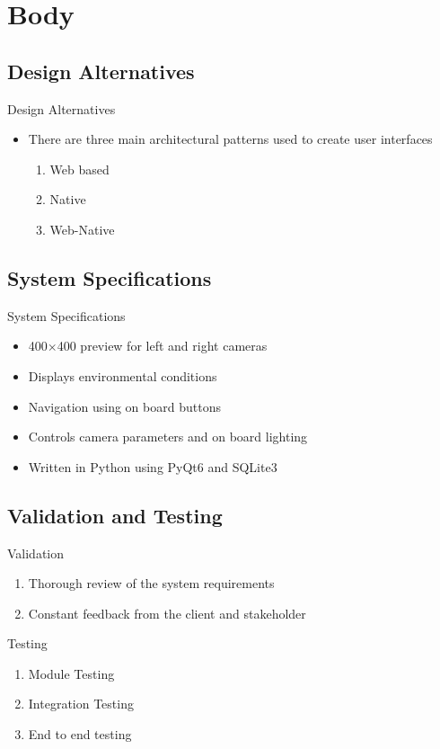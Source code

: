 \documentclass[17pt, aspectratio=169]{beamer}
\begin{document}
\section{Body}
\subsection*{Design Alternatives}
\begin{frame}{Design Alternatives}
	\begin{itemize}

		\item There are three main architectural patterns used to create user interfaces
		      \begin{enumerate}
			      \item Web based
			      \item Native
			      \item Web-Native
		      \end{enumerate}
	\end{itemize}
\end{frame}
\subsection*{System Specifications}
\begin{frame}{System Specifications}
	\begin{itemize}
		\item 400$\times$400 preview for left and right cameras
		\item Displays environmental conditions
		\item Navigation using on board buttons
		\item Controls camera parameters and on board lighting
		\item Written in Python using PyQt6 and SQLite3
	\end{itemize}
\end{frame}
\subsection*{Validation and Testing}
\begin{frame}{Validation}
	\begin{enumerate}
		\item Thorough review of the system requirements
		\item Constant feedback from the client and stakeholder
	\end{enumerate}
\end{frame}
\begin{frame}{Testing}
	\begin{enumerate}
		\item Module Testing
		\item Integration Testing
		\item End to end testing
	\end{enumerate}
\end{frame}
\end{document}
